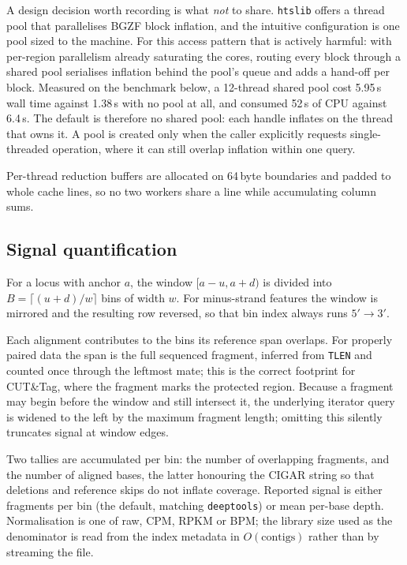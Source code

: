 \documentclass[11pt,a4paper]{article}
\newcommand{\NumCores}{12}
\begin{document}
A design decision worth recording is what \emph{not} to share. \texttt{htslib}
offers a thread pool that parallelises BGZF block inflation, and the intuitive
configuration is one pool sized to the machine. For this access pattern that is
actively harmful: with per-region parallelism already saturating the cores,
routing every block through a shared pool serialises inflation behind the
pool's queue and adds a hand-off per block. Measured on the benchmark below, a
\NumCores-thread shared pool cost 5.95\,s wall time against
1.38\,s with no pool at all, and consumed 52\,s of CPU
against 6.4\,s. The default is therefore no shared pool: each
handle inflates on the thread that owns it. A pool is created only when the
caller explicitly requests single-threaded operation, where it can still
overlap inflation within one query.

Per-thread reduction buffers are allocated on 64\,byte boundaries and
padded to whole cache lines, so no two workers share a line while accumulating
column sums.

\subsection{Signal quantification}

For a locus with anchor $a$, the window $[a - u, a + d)$ is divided into
$B = \lceil (u+d)/w \rceil$ bins of width $w$. For minus-strand features the
window is mirrored and the resulting row reversed, so that bin index always
runs $5' \rightarrow 3'$.

Each alignment contributes to the bins its reference span overlaps. For
properly paired data the span is the full sequenced fragment, inferred from
\texttt{TLEN} and counted once through the leftmost mate; this is the correct
footprint for CUT\&Tag, where the fragment marks the protected region. Because
a fragment may begin before the window and still intersect it, the underlying
iterator query is widened to the left by the maximum fragment length; omitting
this silently truncates signal at window edges.

Two tallies are accumulated per bin: the number of overlapping fragments, and
the number of aligned bases, the latter honouring the CIGAR string so that
deletions and reference skips do not inflate coverage. Reported signal is
either fragments per bin (the default, matching \texttt{deeptools}) or mean
per-base depth. Normalisation is one of raw, CPM, RPKM or BPM; the library
size used as the denominator is read from the index metadata in
$O(\text{contigs})$ rather than by streaming the file.
\end{document}
